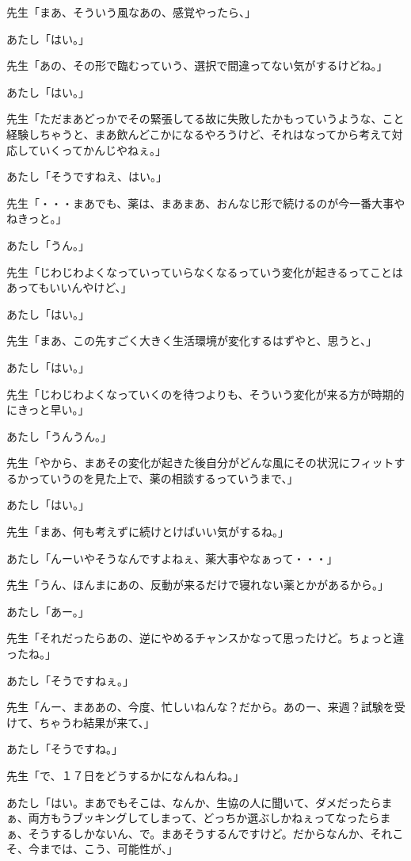 \documentclass[b5j,twoside,twocolumn]{utarticle}
\begin{document}
\begin{description}
\item 先生「まあ、そういう風なあの、感覚やったら、」
\item あたし「はい。」
\item 先生「あの、その形で臨むっていう、選択で間違ってない気がするけどね。」
\item あたし「はい。」
\item 先生「ただまあどっかでその緊張してる故に失敗したかもっていうような、こと経験しちゃうと、まあ飲んどこかになるやろうけど、それはなってから考えて対応していくってかんじやねぇ。」
\item あたし「そうですねえ、はい。」
\item 先生「・・・まあでも、薬は、まあまあ、おんなじ形で続けるのが今一番大事やねきっと。」
\item あたし「うん。」
\item 先生「じわじわよくなっていっていらなくなるっていう変化が起きるってことはあってもいいんやけど、」
\item あたし「はい。」
\item 先生「まあ、この先すごく大きく生活環境が変化するはずやと、思うと、」
\item あたし「はい。」
\item 先生「じわじわよくなっていくのを待つよりも、そういう変化が来る方が時期的にきっと早い。」
\item あたし「うんうん。」
\item 先生「やから、まあその変化が起きた後自分がどんな風にその状況にフィットするかっていうのを見た上で、薬の相談するっていうまで、」
\item あたし「はい。」
\item 先生「まあ、何も考えずに続けとけばいい気がするね。」
\item あたし「んーいやそうなんですよねぇ、薬大事やなぁって・・・」
\item 先生「うん、ほんまにあの、反動が来るだけで寝れない薬とかがあるから。」
\item あたし「あー。」
\item 先生「それだったらあの、逆にやめるチャンスかなって思ったけど。ちょっと違ったね。」
\item あたし「そうですねぇ。」
\item 先生「んー、まああの、今度、忙しいねんな？だから。あのー、来週？試験を受けて、ちゃうわ結果が来て、」
\item あたし「そうですね。」
\item 先生「で、１７日をどうするかになんねんね。」
\item あたし「はい。まあでもそこは、なんか、生協の人に聞いて、ダメだったらまぁ、両方もうブッキングしてしまって、どっちか選ぶしかねぇってなったらまぁ、そうするしかないん、で。まあそうするんですけど。だからなんか、それこそ、今までは、こう、可能性が、」

\end{description}
\end{document}
